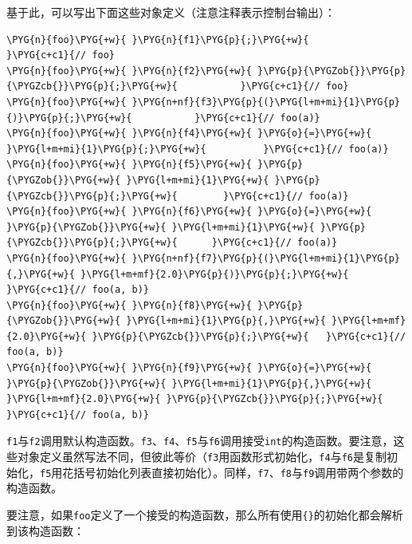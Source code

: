 
基于此，可以写出下面这些对象定义（注意注释表示控制台输出）：



\begin{codeblockbg}
\begin{Verbatim}[commandchars=\\\{\},breaklines=true,breakanywhere=true,fontsize=\codefont,xleftmargin=17bp]
\PYG{n}{foo}\PYG{+w}{ }\PYG{n}{f1}\PYG{p}{;}\PYG{+w}{              }\PYG{c+c1}{// foo}
\PYG{n}{foo}\PYG{+w}{ }\PYG{n}{f2}\PYG{+w}{ }\PYG{p}{\PYGZob{}}\PYG{p}{\PYGZcb{}}\PYG{p}{;}\PYG{+w}{           }\PYG{c+c1}{// foo}
\PYG{n}{foo}\PYG{+w}{ }\PYG{n+nf}{f3}\PYG{p}{(}\PYG{l+m+mi}{1}\PYG{p}{)}\PYG{p}{;}\PYG{+w}{           }\PYG{c+c1}{// foo(a)}
\PYG{n}{foo}\PYG{+w}{ }\PYG{n}{f4}\PYG{+w}{ }\PYG{o}{=}\PYG{+w}{ }\PYG{l+m+mi}{1}\PYG{p}{;}\PYG{+w}{          }\PYG{c+c1}{// foo(a)}
\PYG{n}{foo}\PYG{+w}{ }\PYG{n}{f5}\PYG{+w}{ }\PYG{p}{\PYGZob{}}\PYG{+w}{ }\PYG{l+m+mi}{1}\PYG{+w}{ }\PYG{p}{\PYGZcb{}}\PYG{p}{;}\PYG{+w}{        }\PYG{c+c1}{// foo(a)}
\PYG{n}{foo}\PYG{+w}{ }\PYG{n}{f6}\PYG{+w}{ }\PYG{o}{=}\PYG{+w}{ }\PYG{p}{\PYGZob{}}\PYG{+w}{ }\PYG{l+m+mi}{1}\PYG{+w}{ }\PYG{p}{\PYGZcb{}}\PYG{p}{;}\PYG{+w}{      }\PYG{c+c1}{// foo(a)}
\PYG{n}{foo}\PYG{+w}{ }\PYG{n+nf}{f7}\PYG{p}{(}\PYG{l+m+mi}{1}\PYG{p}{,}\PYG{+w}{ }\PYG{l+m+mf}{2.0}\PYG{p}{)}\PYG{p}{;}\PYG{+w}{      }\PYG{c+c1}{// foo(a, b)}
\PYG{n}{foo}\PYG{+w}{ }\PYG{n}{f8}\PYG{+w}{ }\PYG{p}{\PYGZob{}}\PYG{+w}{ }\PYG{l+m+mi}{1}\PYG{p}{,}\PYG{+w}{ }\PYG{l+m+mf}{2.0}\PYG{+w}{ }\PYG{p}{\PYGZcb{}}\PYG{p}{;}\PYG{+w}{   }\PYG{c+c1}{// foo(a, b)}
\PYG{n}{foo}\PYG{+w}{ }\PYG{n}{f9}\PYG{+w}{ }\PYG{o}{=}\PYG{+w}{ }\PYG{p}{\PYGZob{}}\PYG{+w}{ }\PYG{l+m+mi}{1}\PYG{p}{,}\PYG{+w}{ }\PYG{l+m+mf}{2.0}\PYG{+w}{ }\PYG{p}{\PYGZcb{}}\PYG{p}{;}\PYG{+w}{ }\PYG{c+c1}{// foo(a, b)}
\end{Verbatim}
\end{codeblockbg}



\texttt{f1}与\texttt{f2}调用默认构造函数。\texttt{f3}、\texttt{f4}、\texttt{f5}与\texttt{f6}调用接受\texttt{int}的构造函数。要注意，这些对象定义虽然写法不同，但彼此等价（\texttt{f3}用函数形式初始化，\texttt{f4}与\texttt{f6}是复制初始化，\texttt{f5}用花括号初始化列表直接初始化）。同样，\texttt{f7}、\texttt{f8}与\texttt{f9}调用带两个参数的构造函数。



要注意，如果\texttt{foo}定义了一个接受的构造函数，那么所有使用\texttt{\{\}}的初始化都会解析到该构造函数：



